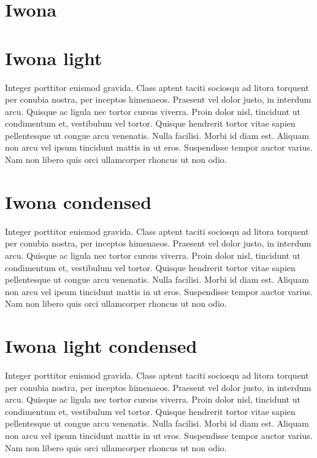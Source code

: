 \documentclass[a4paper]{article}
\begin{document}
\section{Iwona}


\section{Iwona light}

\renewcommand{\rmdefault}{iwonal}\normalfont
Integer porttitor euismod gravida. Class aptent taciti sociosqu ad litora torquent per conubia nostra, per inceptos himenaeos. Praesent vel dolor justo, in interdum arcu. Quisque ac ligula nec tortor cursus viverra. Proin dolor nisl, tincidunt ut condimentum et, vestibulum vel tortor. Quisque hendrerit tortor vitae sapien pellentesque ut congue arcu venenatis. Nulla facilisi. Morbi id diam est. Aliquam non arcu vel ipsum tincidunt mattis in ut eros. Suspendisse tempor auctor varius. Nam non libero quis orci ullamcorper rhoncus ut non odio.

\section{Iwona condensed}

\renewcommand{\rmdefault}{iwonac}\normalfont
Integer porttitor euismod gravida. Class aptent taciti sociosqu ad litora torquent per conubia nostra, per inceptos himenaeos. Praesent vel dolor justo, in interdum arcu. Quisque ac ligula nec tortor cursus viverra. Proin dolor nisl, tincidunt ut condimentum et, vestibulum vel tortor. Quisque hendrerit tortor vitae sapien pellentesque ut congue arcu venenatis. Nulla facilisi. Morbi id diam est. Aliquam non arcu vel ipsum tincidunt mattis in ut eros. Suspendisse tempor auctor varius. Nam non libero quis orci ullamcorper rhoncus ut non odio.


\section{Iwona light condensed}


\renewcommand{\rmdefault}{iwonalc}\normalfont
Integer porttitor euismod gravida. Class aptent taciti sociosqu ad litora torquent per conubia nostra, per inceptos himenaeos. Praesent vel dolor justo, in interdum arcu. Quisque ac ligula nec tortor cursus viverra. Proin dolor nisl, tincidunt ut condimentum et, vestibulum vel tortor. Quisque hendrerit tortor vitae sapien pellentesque ut congue arcu venenatis. Nulla facilisi. Morbi id diam est. Aliquam non arcu vel ipsum tincidunt mattis in ut eros. Suspendisse tempor auctor varius. Nam non libero quis orci ullamcorper rhoncus ut non odio.
\end{document}

